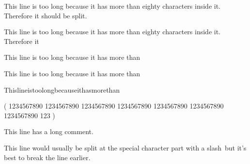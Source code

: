 \documentclass{article}
\begin{document}
This line is too long because it has more than eighty characters inside it. Therefore it should be split.

This line is too long because it has more than eighty characters inside it. Therefore it %

This line is too long because it has more than %

This line is too long because it has more than%

Thislineistoolongbecauseithasmorethan%

(
1234567890 1234567890 1234567890 1234567890 1234567890 1234567890 1234567890 123
)

This line has a long comment. %


This line would usually be split at the special character part with a slash\ but it's best to break the line earlier.
\end{document}
